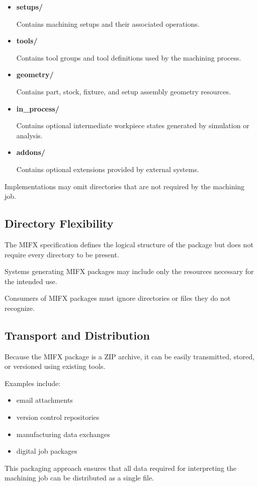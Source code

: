 \begin{itemize}

\item \textbf{setups/}

Contains machining setups and their associated operations.

\item \textbf{tools/}

Contains tool groups and tool definitions used by the machining process.

\item \textbf{geometry/}

Contains part, stock, fixture, and setup assembly geometry resources.

\item \textbf{in\_process/}

Contains optional intermediate workpiece states generated by simulation or analysis.

\item \textbf{addons/}

Contains optional extensions provided by external systems.

\end{itemize}

Implementations may omit directories that are not required by the machining job.

\subsection{Directory Flexibility}

The MIFX specification defines the logical structure of the package but does not require every directory to be present.

Systems generating MIFX packages may include only the resources necessary for the intended use.

Consumers of MIFX packages must ignore directories or files they do not recognize.

\subsection{Transport and Distribution}

Because the MIFX package is a ZIP archive, it can be easily transmitted, stored, or versioned using existing tools.

Examples include:

\begin{itemize}

\item email attachments
\item version control repositories
\item manufacturing data exchanges
\item digital job packages

\end{itemize}

This packaging approach ensures that all data required for interpreting the machining job can be distributed as a single file.